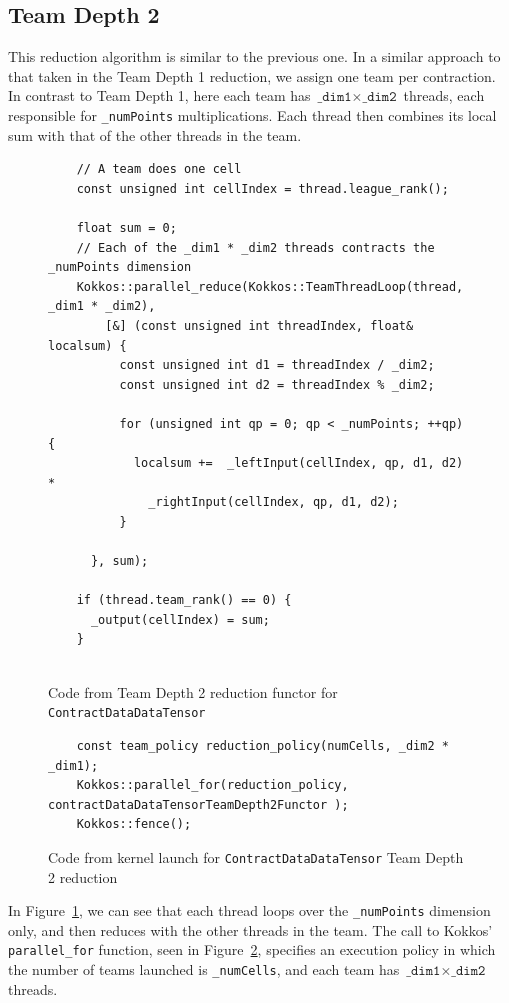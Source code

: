 \subsection{Team Depth 2}
    This reduction algorithm is similar to the previous one.  In a similar
    approach to that taken in the Team Depth 1 reduction, we assign one team per
    contraction.  In contrast to Team Depth 1, here each team has
    $\texttt{\_dim1} \times \texttt{\_dim2}$ threads, each responsible for
    \texttt{\_numPoints} multiplications.  Each thread then combines its local
    sum with that of the other threads in the team.

\begin{figure}[ht]
    \begin{lstlisting}
    // A team does one cell
    const unsigned int cellIndex = thread.league_rank();

    float sum = 0;
    // Each of the _dim1 * _dim2 threads contracts the _numPoints dimension
    Kokkos::parallel_reduce(Kokkos::TeamThreadLoop(thread, _dim1 * _dim2),
        [&] (const unsigned int threadIndex, float& localsum) {
          const unsigned int d1 = threadIndex / _dim2;
          const unsigned int d2 = threadIndex % _dim2;

          for (unsigned int qp = 0; qp < _numPoints; ++qp) {
            localsum +=  _leftInput(cellIndex, qp, d1, d2) *
              _rightInput(cellIndex, qp, d1, d2);
          }

      }, sum);

    if (thread.team_rank() == 0) {
      _output(cellIndex) = sum;
    }
    
 \end{lstlisting}
\caption{Code from Team Depth 2 reduction functor for \texttt{ContractDataDataTensor}
\label{lst:ContractDataDataTensorDepth2Functor}} 
\end{figure}

\begin{figure}[ht]
    \begin{lstlisting}
    const team_policy reduction_policy(numCells, _dim2 * _dim1);
    Kokkos::parallel_for(reduction_policy, contractDataDataTensorTeamDepth2Functor );
    Kokkos::fence();
 \end{lstlisting}
\caption{Code from kernel launch for \texttt{ContractDataDataTensor} Team Depth
2 reduction
\label{lst:ContractDataDataTensorDepth2Call}} 
\end{figure}

In Figure~\ref{lst:ContractDataDataTensorDepth2Functor}, we can see that each
thread loops over the \texttt{\_numPoints} dimension only, and then
reduces with the other threads in the team.  The call to Kokkos'
\texttt{parallel\_for} function, seen in
Figure~\ref{lst:ContractDataDataTensorDepth2Call}, specifies an execution policy
in which the number of teams launched is \texttt{\_numCells}, and each team has
$\texttt{\_dim1}\times \texttt{\_dim2}$ threads.

